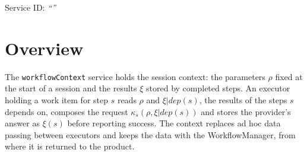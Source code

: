 \documentclass[a4paper]{arrowhead}
\begin{document}
\ArrowheadSetup

\begin{center}
  \vspace*{1cm}
  \huge{\arrowtitle}

  \vspace*{0.2cm}
  \LARGE{\arrowtype}
  \vspace*{1cm}

  \Large{Service ID: \textit{``\arrowid''}}
  \vspace*{\fill}

  

  \vspace*{1cm}
  \vspace*{\fill}

  \begin{abstract}
    This document describes the \texttt{workflowContext} service of the Eclipse Arrowhead workflow support systems, which gives executors the session parameters and the results their step may read, and stores step results. It is provided by the WorkflowManager system, service version 1.0.0, documentation edition 5.4.0.
  \end{abstract}

  \vspace*{1cm}
\end{center}

\newpage

\tableofcontents
\newpage

\section{Overview}
\label{sec:overview}
The \texttt{workflowContext} service holds the session context: the parameters $\rho$ fixed at the
start of a session and the results $\xi$ stored by completed steps. An executor holding a work item for step $s$ reads
$\rho$ and $\xi|dep(s)$, the results of the steps $s$ depends on, composes the request $\kappa_s(\rho, \xi|dep(s))$ and
stores the provider's answer as $\xi(s)$ before reporting success. The context replaces ad hoc data passing between
executors and keeps the data with the WorkflowManager, from where it is returned to the product.
\end{document}

